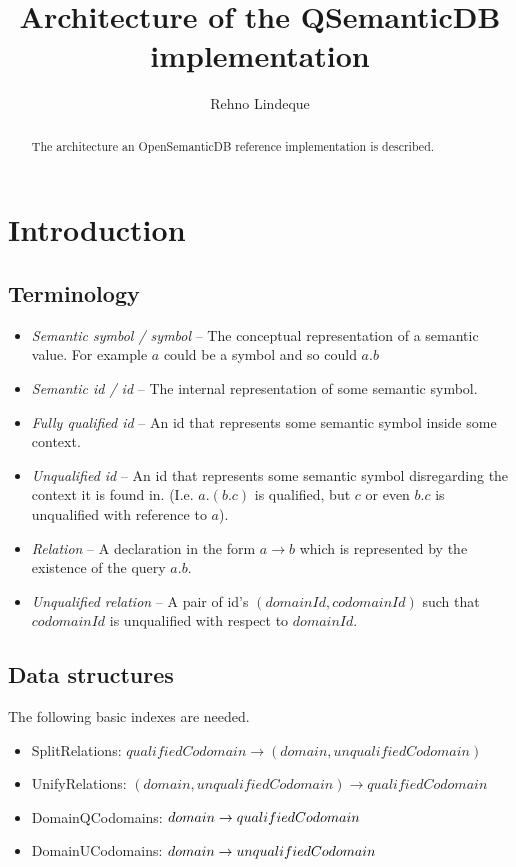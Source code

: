 \documentclass[a4paper,11pt]{article}
\begin{document}
\title{Architecture of the QSemanticDB implementation}
\author{Rehno Lindeque}

\maketitle

\begin{abstract}
The architecture an OpenSemanticDB reference implementation is described.
\end{abstract}

\section{Introduction}

\subsection{Terminology}
\begin{itemize}
\item \emph{Semantic symbol / symbol} -- The conceptual representation of a semantic value. For example $a$ could be a symbol and so could $a.b$
\item \emph{Semantic id / id} -- The internal representation of some semantic symbol.
\item \emph{Fully qualified id} -- An id that represents some semantic symbol inside some context.
\item \emph{Unqualified id} -- An id that represents some semantic symbol disregarding the context it is found in. (I.e. $a.(b.c)$ is qualified, but $c$ or even $b.c$ is unqualified with reference to $a$).
\item \emph{Relation} -- A declaration in the form $a \rightarrow b$ which is represented by the existence of the query $a.b$.
\item \emph{Unqualified relation} -- A pair of id's $(domainId, codomainId)$ such that $codomainId$ is unqualified with respect to $domainId$.
\end{itemize}

\subsection{Data structures}
The following basic indexes are needed.
\begin{itemize}
\item SplitRelations: $qualifiedCodomain \rightarrow (domain, unqualifiedCodomain)$
\item UnifyRelations: $(domain, unqualifiedCodomain) \rightarrow qualifiedCodomain$
\item DomainQCodomains: $domain \rightarrow \* qualifiedCodomain$
\item DomainUCodomains: $domain \rightarrow \* unqualifiedCodomain$
\end{itemize}
\end{document}
